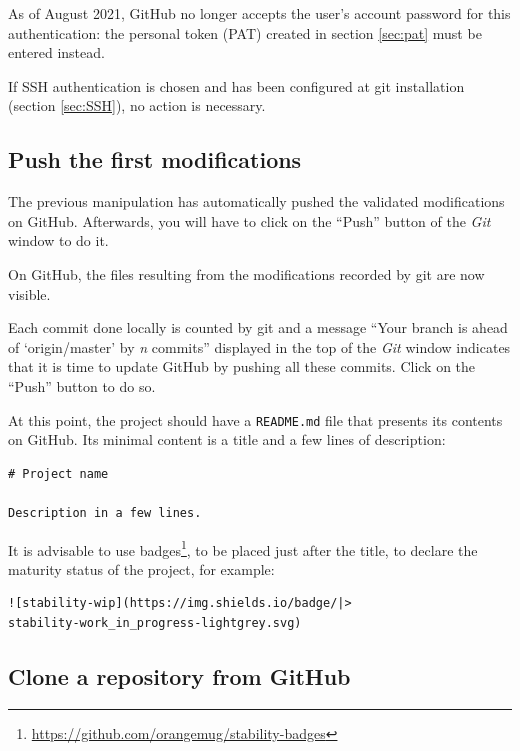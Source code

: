 \documentclass[
  12pt,
  american,
  a4paper,
  extrafontsizes,onecolumn,openright
  ]{memoir}
\begin{document}
\normalsize

As of August 2021, GitHub no longer accepts the user's account password for this authentication: the personal token (PAT) created in section \ref{sec:pat} must be entered instead.

If SSH authentication is chosen and has been configured at git installation (section \ref{sec:SSH}), no action is necessary.

\hypertarget{push-the-first-modifications}{%
\subsection{Push the first modifications}\label{push-the-first-modifications}}

The previous manipulation has automatically pushed the validated modifications on GitHub.
Afterwards, you will have to click on the \enquote{Push} button of the \emph{Git} window to do it.

On GitHub, the files resulting from the modifications recorded by git are now visible.

Each commit done locally is counted by git and a message \enquote{Your branch is ahead of \enquote*{origin/master} by \emph{n} commits} displayed in the top of the \emph{Git} window indicates that it is time to update GitHub by pushing all these commits.
Click on the \enquote{Push} button to do so.

At this point, the project should have a \texttt{README.md} file that presents its contents on GitHub.
Its minimal content is a title and a few lines of description:

\begin{verbatim}
# Project name

Description in a few lines.
\end{verbatim}

It is advisable to use badges\footnote{\url{https://github.com/orangemug/stability-badges}}, to be placed just after the title, to declare the maturity status of the project, for example:

\begin{verbatim}
![stability-wip](https://img.shields.io/badge/|>
stability-work_in_progress-lightgrey.svg)
\end{verbatim}

\hypertarget{clone-a-repository-from-github}{%
\subsection{Clone a repository from GitHub}\label{clone-a-repository-from-github}}
\end{document}
